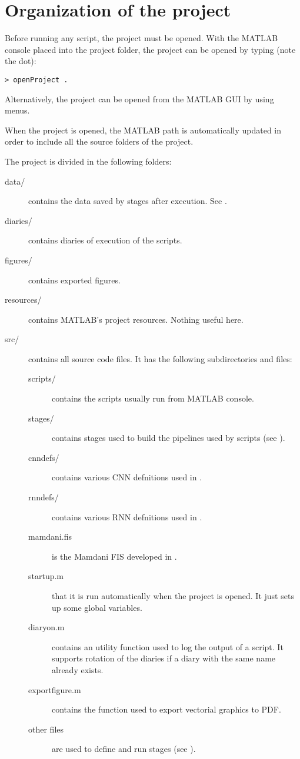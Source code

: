 \section{Organization of the project}\label{sec:organization}

Before running any script, the project must be opened. With the MATLAB console
placed into the project folder, the project can be opened by typing (note the
dot):
\begin{verbatim}
> openProject .
\end{verbatim}
Alternatively, the project can be opened from the MATLAB GUI by using menus.

When the project is opened, the MATLAB path is automatically updated in order
to include all the source folders of the project.

The project is divided in the following folders:
\begin{description}
	\item[data/] contains the data saved by stages after execution. See
		.
	\item[diaries/] contains diaries of execution of the scripts.
	\item[figures/] contains exported figures.
	\item[resources/] contains MATLAB's project resources. Nothing useful
		here.
	\item[src/] contains all source code files. It has the following
		subdirectories and files:
		\begin{description}
			\item[scripts/] contains the scripts usually run from
				MATLAB console.
			\item[stages/] contains stages used to build the
				pipelines used by scripts (see
				).
			\item[cnndefs/] contains various CNN defnitions used in
				.
			\item[rnndefs/] contains various RNN defnitions used in
				.
			\item[mamdani.fis] is the Mamdani FIS developed in
				.
			\item[startup.m] that it is run automatically when the
				project is opened. It just sets up some global
				variables.
			\item[diaryon.m] contains an utility function used to
				log the output of a script. It supports
				rotation of the diaries if a diary with the
				same name already exists.
			\item[exportfigure.m] contains the function used to
				export vectorial graphics to PDF.
			\item[other files] are used to define and run stages
				(see ).
		\end{description}
\end{description}

